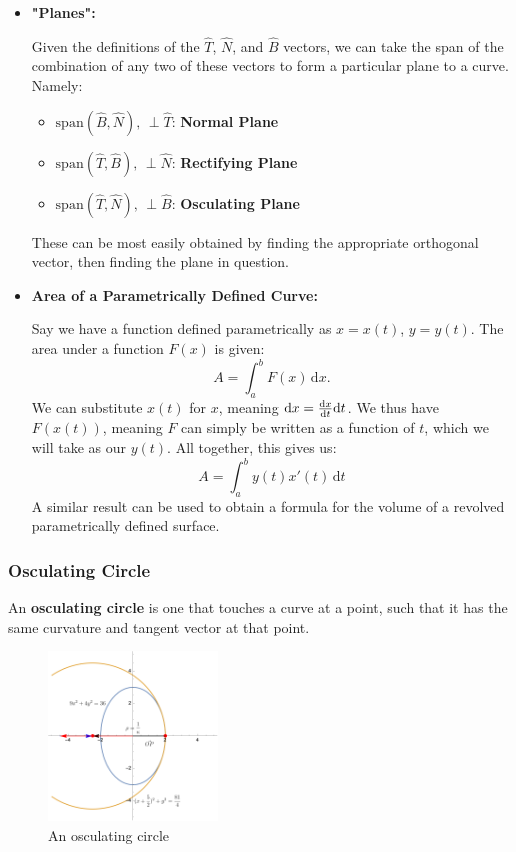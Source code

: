 \documentclass[12pt]{article}
\begin{document}
{\begin{itemize}
To determine the direction of $\hat{N}$ along a planar curve, one must consider the curvature; $\hat{N}$ always points towards the "inside" of curve, ie, along increasing angle of $\hat{T}$ with the horizontal. See Figure \ref{fig:normal_direction}.

\item \textbf{"Planes":}

Given the definitions of the $\hat{T}$, $\hat{N}$, and $\hat{B}$ vectors, we can take the span of the combination of any two of these vectors to form a particular plane to a curve. Namely:

\begin{itemize}
    \item $\text{span}(\hat{B}, \hat{N}), \, \perp \hat{T}$: \textbf{Normal Plane}
    \item $\text{span}(\hat{T}, \hat{B}), \, \perp \hat{N}$: \textbf{Rectifying Plane}
    \item $\text{span}(\hat{T}, \hat{N}), \, \perp \hat{B}$: \textbf{Osculating Plane}
\end{itemize}

These can be most easily obtained by finding the appropriate orthogonal vector, then finding the plane in question.

\item \textbf{Area of a Parametrically Defined Curve:}

Say we have a function defined parametrically as $x = x(t)$, $y = y(t)$. The area under a function $F(x)$ is given: \[A = \int_a^b F(x) \, \text{d}x.\] We can substitute $x(t)$ for $x$, meaning $\text{d}x = \frac{\text{d}x}{\text{d}t} \text{d}t$. We thus have $F(x(t))$, meaning $F$ can simply be written as a function of $t$, which we will take as our $y(t)$. All together, this gives us: \[A = \int_a^b y(t) x'(t) \, \text{d}t\] A similar result can be used to obtain a formula for the volume of a revolved parametrically defined surface.
\end{itemize}

\subsubsection{Osculating Circle}

An \textbf{osculating circle} is one that touches a curve at a point, such that it has the same curvature and tangent vector at that point.

\begin{figure}[!ht]
    \centering
    \includegraphics[width=0.4\textwidth]{misc/osculating.png}
    \caption{An osculating circle}
    \label{fig:osculating_circle}
\end{figure}

}
\end{document}
